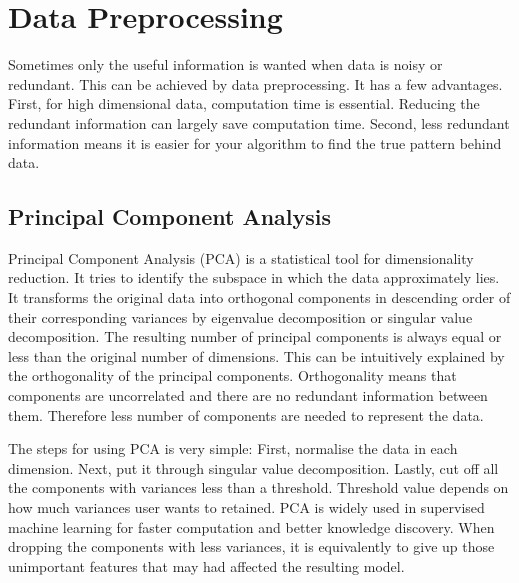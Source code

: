 \documentclass[11pt]{report}
\numberwithin{equation}{chapter}
\begin{document}
\begin{spacing}{2}
\begin{figure}[!htb]
\end{figure}

\newpage
\section{Data Preprocessing}
\label{sec:preprocessing}
Sometimes only the useful information is wanted when data is noisy or redundant. This can be achieved by data preprocessing. It has a few advantages. First, for high dimensional data, computation time is essential. Reducing the redundant information can largely save computation time. Second, less redundant information means it is easier for your algorithm to find the true pattern behind data. 

\subsection{Principal Component Analysis}
Principal Component Analysis (PCA) is a statistical tool for dimensionality reduction. It tries to identify the subspace in which the data approximately lies. It transforms the original data into orthogonal components in descending order of their corresponding variances\cite{jolliffe2002principal} by eigenvalue decomposition or singular value decomposition\cite{golub1965calculating}. The resulting number of principal components is always equal or less than the original number of dimensions. This can be intuitively explained by the orthogonality of the principal components. Orthogonality means that components are uncorrelated and there are no redundant information between them. Therefore less number of components are needed to represent the data. 

The steps for using PCA is very simple: First, normalise the data in each dimension. Next, put it through singular value decomposition. Lastly, cut off all the components with variances less than a threshold. Threshold value depends on how much variances user wants  to retained. PCA is widely used in supervised machine learning for faster computation and better knowledge discovery. When dropping the components with less variances, it is equivalently to give up those unimportant features that may had affected the resulting model.  

 

\end{spacing}
\end{document}
